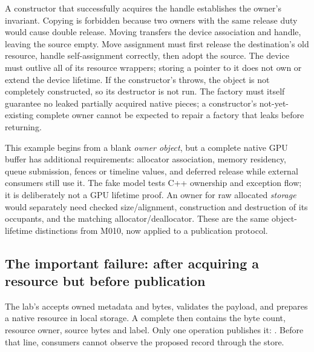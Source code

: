 A constructor that successfully acquires the handle establishes the owner's invariant. Copying is forbidden because two owners with the same release duty would cause double release. Moving transfers the device association and handle, leaving the source empty. Move assignment must first release the destination's old resource, handle self-assignment correctly, then adopt the source. The device must outlive all of its resource wrappers; storing a pointer to it does not own or extend the device lifetime. If the constructor's  throws, the  object is not completely constructed, so its destructor is not run. The factory must itself guarantee no leaked partially acquired native pieces; a constructor's not-yet-existing complete owner cannot be expected to repair a factory that leaks before returning.

This example begins from a blank \emph{owner object}, but a complete native GPU buffer has additional requirements: allocator association, memory residency, queue submission, fences or timeline values, and deferred release while external consumers still use it. The fake model tests C++ ownership and exception flow; it is deliberately not a GPU lifetime proof. An owner for raw allocated \emph{storage} would separately need checked size/alignment, construction and destruction of its occupants, and the matching allocator/deallocator. These are the same object-lifetime distinctions from M010, now applied to a publication protocol.

\subsection{The important failure: after acquiring a resource but before publication}\label{01-foundations-i-ch004-the-important-failure-after-acquiring-a-resource-but-before-publication}

\hypertarget{01-foundations-i-ch004-the-important-failure-after-acquiring-a-resource-but-before-publication}{}

The lab's  accepts owned metadata and bytes, validates the payload, and prepares a native resource in local storage. A complete  then contains the byte count, resource owner, source bytes and label. Only one operation publishes it: . Before that line, consumers cannot observe the proposed record through the store.

